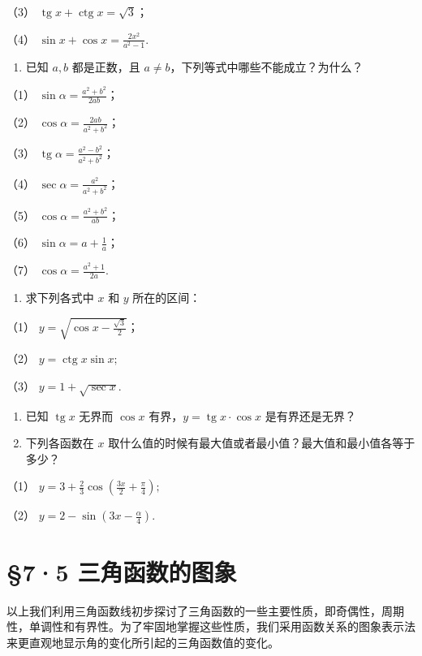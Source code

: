 （3） \(\operatorname{tg} x + \operatorname{ctg} x = \sqrt{3}\)；

（4） \(\sin x + \cos x = \frac{2x^2}{a^2 - 1}\).

\begin{enumerate}[start=2]
\item
  已知 \(a, b\) 都是正数，且
  \(a \neq b\)，下列等式中哪些不能成立？为什么？
\end{enumerate}

（1） \(\sin\alpha=\frac{a^2+b^2}{2ab}\)；

（2） \(\cos\alpha=\frac{2ab}{a^2+b^2}\)；

（3） \(\operatorname{tg}\alpha=\frac{a^2-b^2}{a^2+b^2}\)；

（4） \(\sec\alpha=\frac{a^2}{a^2+b^2}\)；

（5） \(\cos \alpha = \frac{a^2 + b^2}{ab}\)；

（6） \(\sin \alpha = a + \frac{1}{a}\)；

（7） \(\cos \alpha = \frac{a^2 + 1}{2a}\).

\begin{enumerate}[start=9]
\item
  求下列各式中 \(x\) 和 \(y\) 所在的区间：
\end{enumerate}

（1） \(y = \sqrt{\cos x - \frac{\sqrt{3}}{2}}\)；

（2） \(y = \operatorname{ctg} x \sin x;\)

（3） \(y = 1 + \sqrt{\sec x}\).

\begin{enumerate}[start=4]
\item
  已知 \(\operatorname{tg} x\) 无界而 \(\cos x\)
  有界，\(y = \operatorname{tg} x \cdot \cos x\) 是有界还是无界？
\item
  下列各函数在 \(x\)
  取什么值的时候有最大值或者最小值？最大值和最小值各等于多少？
\end{enumerate}

（1）
\(y = 3 + \frac{2}{3}\cos \left(\frac{3x}{2} + \frac{\pi}{4}\right);\)

（2） \(y = 2 - \sin \left(3x - \frac{\alpha}{4}\right)\).

\section{§7·5 三角函数的图象}

以上我们利用三角函数线初步探讨了三角函数的一些主要性质，即奇偶性，周期性，单调性和有界性。为了牢固地掌握这些性质，我们采用函数关系的图象表示法来更直观地显示角的变化所引起的三角函数值的变化。

